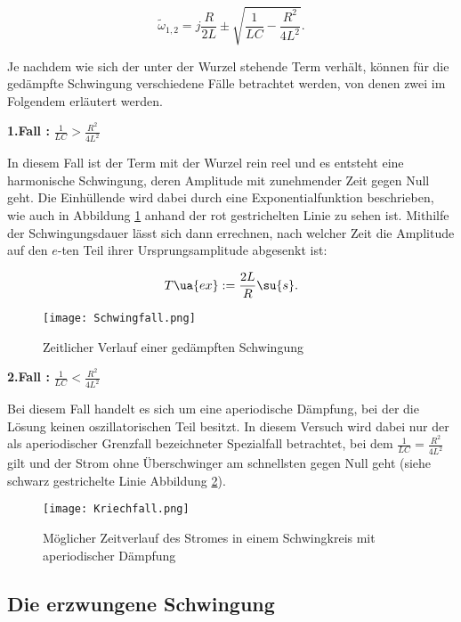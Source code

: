 \begin{equation}
  \tilde{\omega}_{1,2} = j \frac{R}{2L} \pm \sqrt{ \frac{1}{LC} - \frac{R^2}{4L^2}} .
\end{equation}

Je nachdem wie sich der unter der Wurzel stehende Term verhält, können für die
gedämpfte Schwingung verschiedene Fälle betrachtet werden, von denen zwei im Folgendem
erläutert werden.

\textbf{1.Fall :} $\frac{1}{LC} > \frac{R^2}{4L^2}$

In diesem Fall ist der Term mit der Wurzel rein reel und  es entsteht eine
harmonische Schwingung, deren Amplitude mit zunehmender
Zeit gegen Null geht. Die Einhüllende wird dabei durch eine Exponentialfunktion
beschrieben, wie auch in Abbildung \ref{fig:Schwingfall} anhand der rot gestrichelten
Linie zu sehen ist.
Mithilfe der Schwingungsdauer lässt sich dann errechnen, nach welcher
Zeit die Amplitude auf den $e$-ten Teil ihrer Ursprungsamplitude abgesenkt ist:

\begin{equation}
  \label{eqn:T_ex}
  T\ua{ex} := \frac{2L}{R} \su{s} .
\end{equation}

\begin{figure}
  \centering
  \texttt{[image: Schwingfall.png]}
  \caption{Zeitlicher Verlauf einer gedämpften Schwingung}
  \label{fig:Schwingfall}
\end{figure}

\textbf{2.Fall :} $\frac{1}{LC} < \frac{R^2}{4L^2}$

Bei diesem Fall handelt es sich um eine aperiodische Dämpfung, bei der die Lösung
keinen oszillatorischen Teil besitzt. In diesem Versuch wird dabei nur der als
aperiodischer Grenzfall bezeichneter Spezialfall betrachtet, bei dem
$\frac{1}{LC} = \frac{R^2}{4L^2}$ gilt und der Strom ohne Überschwinger am schnellsten
gegen Null geht (siehe schwarz gestrichelte Linie Abbildung \ref{fig:Kriechfall}).

\begin{figure}
  \texttt{[image: Kriechfall.png]}
  \caption{Möglicher Zeitverlauf des Stromes in einem Schwingkreis mit aperiodischer Dämpfung}
  \label{fig:Kriechfall}
\end{figure}

\newpage

\subsection{Die erzwungene Schwingung}

